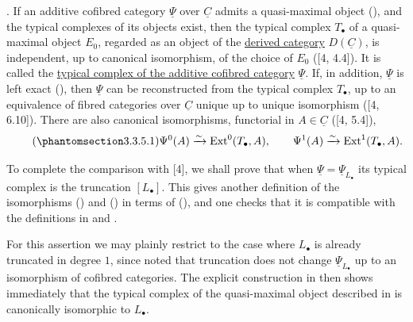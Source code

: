 . If an additive cofibred category $\underline\Psi$ over
$\underline C$ admits a quasi-maximal object (), and the typical
complexes of its objects exist, then the typical complex $T_\bullet$
of a quasi-maximal object $E_0$, regarded as an object of the
\underline{derived category} $D(\underline C)$, is independent, up
to canonical isomorphism, of the choice of $E_0$ ([4, 4.4]). It is
called the \underline{typical complex of the additive cofibred
category} $\underline\Psi$. If, in addition, $\underline\Psi$ is
left exact (), then $\underline\Psi$ can be reconstructed from
the typical complex $T_\bullet$, up to an equivalence of fibred
categories over $\underline C$ unique up to unique isomorphism
([4, 6.10]). There are also canonical isomorphisms, functorial in
$A\in\underline C$ ([4, 5.4]),
\begin{equation}\tag{\SGARefTarget{sga7.sga7i.evii.n3-3-5-1}{3.3.5.1}}
 \Psi^0(A)\xrightarrow{\sim}\Ext^0(T_\bullet,A),
 \qquad
 \Psi^1(A)\xrightarrow{\sim}\Ext^1(T_\bullet,A).
\end{equation}

To complete the comparison with [4], we shall prove that when
$\underline\Psi=\underline\Psi_{L_\bullet}$ its typical complex is
the truncation $[L_\bullet]$. This gives another definition of the
isomorphisms () and () in terms of (), and one
checks that it is compatible with the definitions in  and .

For this assertion we may plainly restrict to the case where
$L_\bullet$ is already truncated in degree $1$, since  noted that
truncation does not change $\underline\Psi_{L_\bullet}$ up to an
isomorphism of cofibred categories. The explicit construction in
 then shows immediately that the typical complex of the
quasi-maximal object described in  is canonically isomorphic to
$L_\bullet$.

